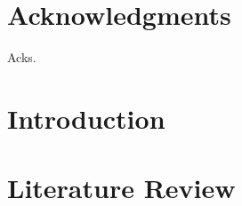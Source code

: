 \documentclass[edeposit,fullpage]{uiucthesis2018}
\title{\pygen}
\author{Samuel G. Dotson}
\begin{document}
\maketitle

\frontmatter
\begin{abstract}

Abstract.

\end{abstract}

\chapter*{Acknowledgments}

Acks.


\tableofcontents
\listoftables
\listoffigures


\pagebreak
\mainmatter

\chapter{Introduction}


\chapter{Literature Review}

\end{document}
